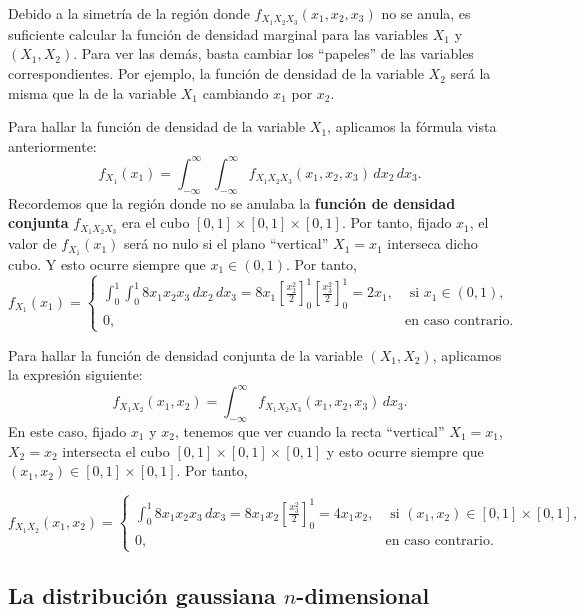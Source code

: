\documentclass[]{book}
\begin{document}
Debido a la simetría de la región donde \(f_{X_1X_2X_3}(x_1,x_2,x_3)\) no se anula, es suficiente calcular la función de densidad marginal para las variables \(X_1\) y \((X_1,X_2)\). Para ver las demás, basta cambiar los ``papeles'' de las variables correspondientes. Por ejemplo, la función de densidad de la variable \(X_2\) será la misma que la de la variable \(X_1\) cambiando \(x_1\) por \(x_2\).

Para hallar la función de densidad de la variable \(X_1\), aplicamos la fórmula vista anteriormente:
\[
f_{X_1}(x_1)=\int_{-\infty}^\infty\int_{-\infty}^\infty  f_{X_1X_2X_3}(x_1,x_2,x_3)\, dx_2\, dx_3.
\]
Recordemos que la región donde no se anulaba la \textbf{función de densidad conjunta} \(f_{X_1X_2X_3}\) era el cubo \([0,1]\times [0,1]\times [0,1]\). Por tanto, fijado \(x_1\), el valor de \(f_{X_1}(x_1)\) será no nulo si el plano ``vertical'' \(X_1=x_1\) interseca dicho cubo. Y esto ocurre siempre que \(x_1\in (0,1)\). Por tanto,
\[
f_{X_1}(x_1)=\begin{cases}
\int_{0}^1\int_0^1 8 x_1x_2 x_3  \, dx_2\, dx_3=8x_1\left[\frac{x_2^2}{2}\right]_0^1 \left[\frac{x_3^2}{2}\right]_0^1 =2 x_1, & \mbox{ si }x_1\in (0,1),\\
0, & \mbox{en caso contrario.}
\end{cases}
\]

Para hallar la función de densidad conjunta de la variable \((X_1,X_2)\), aplicamos la expresión siguiente:
\[
f_{X_1X_2}(x_1,x_2)=\int_{-\infty}^\infty  f_{X_1X_2X_3}(x_1,x_2,x_3)\, dx_3.
\]
En este caso, fijado \(x_1\) y \(x_2\), tenemos que ver cuando la recta ``vertical'' \(X_1=x_1\), \(X_2=x_2\) intersecta el cubo \([0,1]\times [0,1]\times [0,1]\) y esto ocurre siempre que \((x_1,x_2)\in [0,1]\times [0,1]\).
Por tanto,

\[
f_{X_1X_2}(x_1,x_2)=\begin{cases}
\int_{0}^1 8 x_1x_2 x_3  \, dx_3=8x_1x_2 \left[\frac{x_3^2}{2}\right]_0^1 =4 x_1 x_2, & \mbox{ si }(x_1,x_2)\in [0,1]\times [0,1],\\
0, & \mbox{en caso contrario.}
\end{cases}
\]

\hypertarget{la-distribuciuxf3n-gaussiana-n-dimensional}{%
\subsection{\texorpdfstring{La distribución gaussiana \(n\)-dimensional}{La distribución gaussiana n-dimensional}}\label{la-distribuciuxf3n-gaussiana-n-dimensional}}
\end{document}
